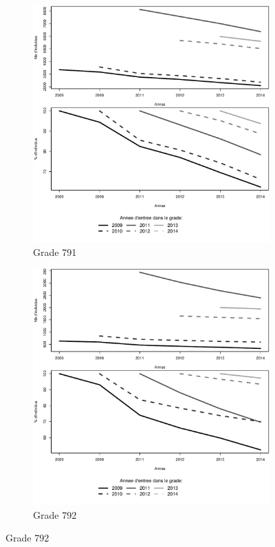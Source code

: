 \documentclass[11pt,a4paper]{article}
\begin{document}
\begin{figure}[ht] 
  \caption{Survie dans le grade: Adjoints administratifs}
  \label{surv_by_entry_AT} 
  \begin{subfigure}[b]{0.5\linewidth}
      \caption{Grade 791} 
    \label{echelon_by_neg_791} 
    \centering
    \includegraphics[width=1\linewidth]{AA_survival_791.pdf} 
  \end{subfigure}%
  \begin{subfigure}[b]{0.5\linewidth}
        \caption{Grade 792} 
    \label{echelon_by_neg_792} 
    \centering
    \includegraphics[width=1\linewidth]{AA_survival_792.pdf} 
  \end{subfigure} 
\end{figure}
\end{document}
